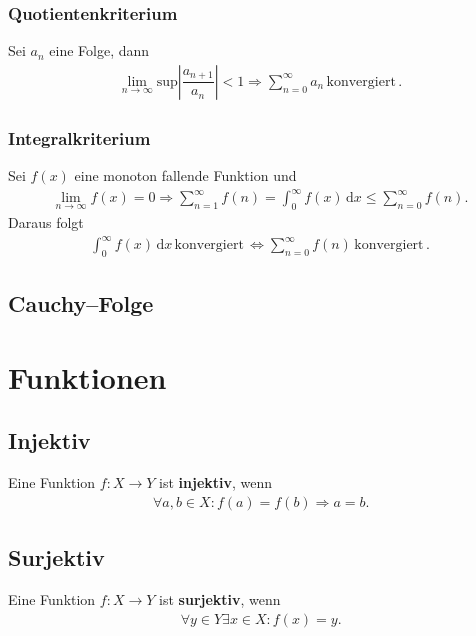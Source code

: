 \documentclass[a4paper,12pt]{article}
\newcommand{\td}{\,\text{d}}
\numberwithin{equation}{section}
\begin{document}
\subsubsection{Quotientenkriterium}
Sei $a_n$ eine Folge, dann
\begin{align} 
        \lim_{n\rightarrow \infty}\text{sup}\left|\dfrac{a_{n+1}}{a_n}\right|<1\Rightarrow \sum_{n=0}^{\infty}a_n \,\text{konvergiert}\,\label{eq:quotientenkriterium}
.\end{align} 

\subsubsection{Integralkriterium}
Sei $f\left(x\right)$ eine monoton fallende Funktion und
\begin{align} 
        \lim_{n\rightarrow \infty}f\left(x\right)=0\Rightarrow \sum_{n=1}^{\infty}f\left(n\right)=\int_{0}^{\infty}f\left(x\right)\td x\leq \sum_{n=0}^{\infty}f\left(n\right)
.\end{align} 
Daraus folgt
\begin{align} 
        \int_{0}^{\infty}f\left(x\right)\td x\,\text{konvergiert}\,\Leftrightarrow \sum_{n=0}^{\infty}f\left(n\right)\,\text{konvergiert}\,\label{eq:integralkriterium}
.\end{align} 


\subsection{Cauchy--Folge}

\newpage
\section{Funktionen}
\subsection{Injektiv}
Eine Funktion $f:X\rightarrow Y$ ist \textbf{injektiv}, wenn
\begin{align} 
        \,\forall a,b \in X:f\left(a\right)=f\left(b\right)\Rightarrow a=b
.\end{align} 

\subsection{Surjektiv}
Eine Funktion $f:X\rightarrow Y$ ist \textbf{surjektiv}, wenn
\begin{align} 
        \,\forall y \in Y\exists x \in X:f\left(x\right)=y
.\end{align} 
\end{document}
